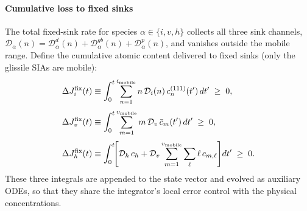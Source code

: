 \paragraph{Cumulative loss to fixed sinks}
The total fixed-sink rate for species $\alpha\in\{i,v,h\}$ collects all three
sink channels,
$\mathcal{D}_\alpha(n) = \mathcal{D}_\alpha^d(n) +
 \mathcal{D}_\alpha^{gb}(n) + \mathcal{D}_\alpha^p(n)$, and vanishes outside the
mobile range. Define the cumulative atomic content delivered to fixed sinks
(only the glissile SIAs are mobile):
\begin{align}
    \Delta J_i^{\mathrm{fix}}(t)
    &\equiv \int_0^t \sum_{n=1}^{i_{\rm mobile}}
        n\,\mathcal{D}_i(n)\,c^{(111)}_n(t')\,dt' \;\ge\; 0,
    \label{eq:DeltaJi_fix}\\[3pt]
    \Delta J_v^{\mathrm{fix}}(t)
    &\equiv \int_0^t \sum_{m=1}^{v_{\rm mobile}}
        m\,\mathcal{D}_v\,\bar{c}_m(t')\,dt' \;\ge\; 0,
    \label{eq:DeltaJv_fix}\\[3pt]
    \Delta J_h^{\mathrm{fix}}(t)
    &\equiv \int_0^t\!\!\left[
        \mathcal{D}_h\,c_h
        + \mathcal{D}_v
          \sum_{m=1}^{v_{\rm mobile}}\sum_{\ell}\ell\,c_{m,\ell}
      \right]\!dt' \;\ge\; 0.
    \label{eq:DeltaJh_fix}
\end{align}
These three integrals are appended to the state vector and evolved as auxiliary
ODEs, so that they share the integrator's local error control with the physical
concentrations.

